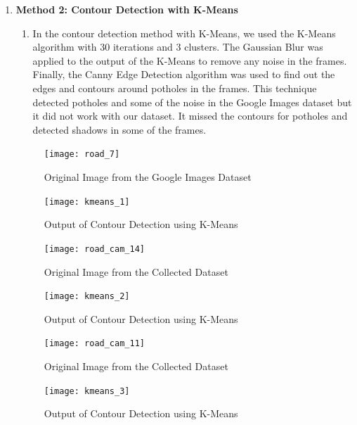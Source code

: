 \documentclass[12pt,a4paper]{article}
\begin{document}
\begin{enumerate}
\begin{enumerate}
    \item \textbf{Method 2: Contour Detection with K-Means}
    \begin{enumerate}
        \item In the contour detection method with K-Means, we used the K-Means algorithm with 30 iterations and 3 clusters. The Gaussian Blur was applied to the output of the K-Means to remove any noise in the frames. Finally, the Canny Edge Detection algorithm was used to find out the edges and contours around potholes in the frames. This technique detected potholes and some of the noise in the Google Images dataset but it did not work with our dataset. It missed the contours for potholes and detected shadows in some of the frames.
    \end{enumerate}
    \pagebreak
    
    \begin{figure}[ht!]
        \centering
        \texttt{[image: road\_7]}
        \caption{Original Image from the Google Images Dataset}
    \end{figure}

    \begin{figure}[ht!]
        \centering
        \texttt{[image: kmeans\_1]}
        \caption{Output of Contour Detection using K-Means}
    \end{figure}
    \pagebreak
    
    \begin{figure}[ht!]
        \centering
        \texttt{[image: road\_cam\_14]}
        \caption{Original Image from the Collected Dataset}
    \end{figure}

    \begin{figure}[ht!]
        \centering
        \texttt{[image: kmeans\_2]}
        \caption{Output of Contour Detection using K-Means}
    \end{figure}
    \pagebreak
    
    \begin{figure}[ht!]
        \centering
        \texttt{[image: road\_cam\_11]}
        \caption{Original Image from the Collected Dataset}
    \end{figure}

    \begin{figure}[ht!]
        \centering
        \texttt{[image: kmeans\_3]}
        \caption{Output of Contour Detection using K-Means}
    \end{figure}
    \pagebreak
    

\end{enumerate}
\end{enumerate}
\end{document}
